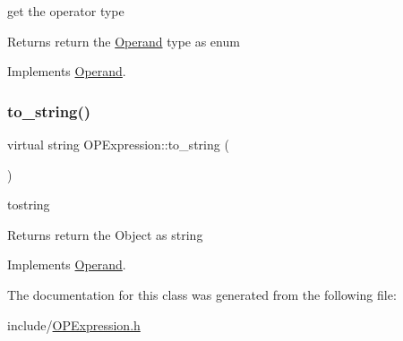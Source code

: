 get the operator type 

\begin{DoxyReturn}{Returns}
return the \mbox{\hyperlink{class_operand}{Operand}} type as enum 
\end{DoxyReturn}


Implements \mbox{\hyperlink{class_operand_afd469e305a467e2574f34ac9bd6c62b0}{Operand}}.

\mbox{\label{class_o_p_expression_a0a6ee03eb083791028eeae021f4ff47b}} 
\subsubsection{\texorpdfstring{to\+\_\+string()}{to\_string()}}
{\footnotesize\ttfamily virtual string O\+P\+Expression\+::to\+\_\+string (\begin{DoxyParamCaption}{ }\end{DoxyParamCaption})\hspace{0.3cm}{\ttfamily [virtual]}}



tostring 

\begin{DoxyReturn}{Returns}
return the Object as string 
\end{DoxyReturn}


Implements \mbox{\hyperlink{class_operand_a28aed96d5fafee66be81c30c1435ad00}{Operand}}.



The documentation for this class was generated from the following file\+:\begin{DoxyCompactItemize}
\item 
include/\mbox{\hyperlink{_o_p_expression_8h}{O\+P\+Expression.\+h}}\end{DoxyCompactItemize}
